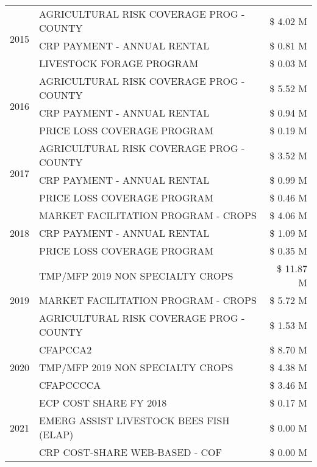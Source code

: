 \begin{tabular}{llr}
\multirow[t]{3}{*}{2015} & AGRICULTURAL RISK COVERAGE PROG - COUNTY & \$ 4.02 M \\
 & CRP PAYMENT - ANNUAL RENTAL & \$ 0.81 M \\
 & LIVESTOCK FORAGE PROGRAM & \$ 0.03 M \\
\cline{1-3}
\multirow[t]{3}{*}{2016} & AGRICULTURAL RISK COVERAGE PROG - COUNTY & \$ 5.52 M \\
 & CRP PAYMENT - ANNUAL RENTAL & \$ 0.94 M \\
 & PRICE LOSS COVERAGE PROGRAM & \$ 0.19 M \\
\cline{1-3}
\multirow[t]{3}{*}{2017} & AGRICULTURAL RISK COVERAGE PROG - COUNTY & \$ 3.52 M \\
 & CRP PAYMENT - ANNUAL RENTAL & \$ 0.99 M \\
 & PRICE LOSS COVERAGE PROGRAM & \$ 0.46 M \\
\cline{1-3}
\multirow[t]{3}{*}{2018} & MARKET FACILITATION PROGRAM - CROPS & \$ 4.06 M \\
 & CRP PAYMENT - ANNUAL RENTAL & \$ 1.09 M \\
 & PRICE LOSS COVERAGE PROGRAM & \$ 0.35 M \\
\cline{1-3}
\multirow[t]{3}{*}{2019} & TMP/MFP 2019 NON SPECIALTY CROPS & \$ 11.87 M \\
 & MARKET FACILITATION PROGRAM - CROPS & \$ 5.72 M \\
 & AGRICULTURAL RISK COVERAGE PROG - COUNTY & \$ 1.53 M \\
\cline{1-3}
\multirow[t]{3}{*}{2020} & CFAPCCA2 & \$ 8.70 M \\
 & TMP/MFP 2019 NON SPECIALTY CROPS & \$ 4.38 M \\
 & CFAPCCCCA & \$ 3.46 M \\
\cline{1-3}
\multirow[t]{3}{*}{2021} & ECP COST SHARE FY 2018 & \$ 0.17 M \\
 & EMERG ASSIST LIVESTOCK BEES FISH (ELAP) & \$ 0.00 M \\
 & CRP COST-SHARE WEB-BASED - COF & \$ 0.00 M \\
\cline{1-3}
\bottomrule
\end{tabular}
